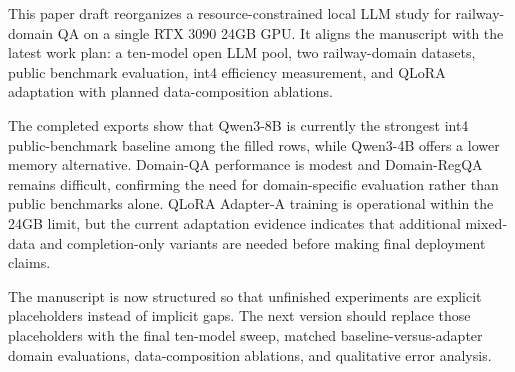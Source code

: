 \label{sec:conclusion}

This paper draft reorganizes a resource-constrained local LLM study for
railway-domain QA on a single RTX 3090 24GB GPU. It aligns the manuscript with
the latest work plan: a ten-model open LLM pool, two railway-domain datasets,
public benchmark evaluation, int4 efficiency measurement, and QLoRA adaptation
with planned data-composition ablations.

The completed exports show that Qwen3-8B is currently the strongest int4
public-benchmark baseline among the filled rows, while Qwen3-4B offers a lower
memory alternative. Domain-QA performance is modest and Domain-RegQA remains
difficult, confirming the need for domain-specific evaluation rather than
public benchmarks alone. QLoRA Adapter-A training is operational within the
24GB limit, but the current adaptation evidence indicates that additional
mixed-data and completion-only variants are needed before making final
deployment claims.

The manuscript is now structured so that unfinished experiments are explicit
placeholders instead of implicit gaps. The next version should replace those
placeholders with the final ten-model sweep, matched baseline-versus-adapter
domain evaluations, data-composition ablations, and qualitative error analysis.
